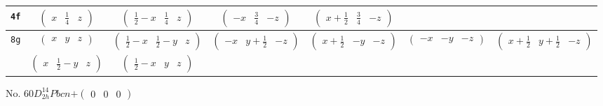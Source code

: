 \documentclass[fleqn,9pt,landscape]{jsarticle}
\begin{document}
\begin{center}
\begin{longtable}{ccccccc}
{\tt 4f} & $ \begin{pmatrix} x & \frac{1}{4} & z \end{pmatrix} $ & $ \begin{pmatrix} \frac{1}{2} - x & \frac{1}{4} & z \end{pmatrix} $ & $ \begin{pmatrix} - x & \frac{3}{4} & - z \end{pmatrix} $ & $ \begin{pmatrix} x + \frac{1}{2} & \frac{3}{4} & - z \end{pmatrix} $ & $  $ & $  $ \\ \hline
{\tt 8g} & $ \begin{pmatrix} x & y & z \end{pmatrix} $ & $ \begin{pmatrix} \frac{1}{2} - x & \frac{1}{2} - y & z \end{pmatrix} $ & $ \begin{pmatrix} - x & y + \frac{1}{2} & - z \end{pmatrix} $ & $ \begin{pmatrix} x + \frac{1}{2} & - y & - z \end{pmatrix} $ & $ \begin{pmatrix} - x & - y & - z \end{pmatrix} $ & $ \begin{pmatrix} x + \frac{1}{2} & y + \frac{1}{2} & - z \end{pmatrix} $ \\
& $ \begin{pmatrix} x & \frac{1}{2} - y & z \end{pmatrix} $ & $ \begin{pmatrix} \frac{1}{2} - x & y & z \end{pmatrix} $ & $  $ & $  $ & $  $ & $  $ \\
\end{longtable}
\end{center}
\newpage
No. 60\quad$D_{2h}^{14}$\quad$Pbcn$\quad[ orthorhombic ]\quad$+\begin{pmatrix} 0 & 0 & 0 \end{pmatrix}$
\end{document}

